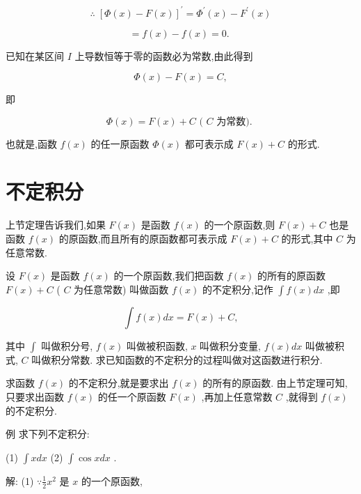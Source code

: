 \documentclass[lang=cn,newtx,10pt,scheme=chinese]{elegantbook}
\begin{document}
\[
\therefore \;{\left\lbrack \Phi \left( x\right) - F\left( x\right) \right\rbrack }^{\prime } = {\Phi }^{\prime }\left( x\right) - {F}^{\prime }\left( x\right)
\]

\[
= f\left( x\right) - f\left( x\right) = 0\text{. }
\]

已知在某区间 \(I\) 上导数恒等于零的函数必为常数,由此得到

\[
\Phi \left( x\right) - F\left( x\right) = C,
\]

即

\[
\Phi \left( x\right) = F\left( x\right) + C\text{ ( }C\text{ 为常数). }
\]

也就是,函数 \(f\left( x\right)\) 的任一原函数 \(\Phi \left( x\right)\) 都可表示成 \(F\left( x\right) + C\) 的形式.

\section{不定积分}

上节定理告诉我们,如果 \(F\left( x\right)\) 是函数 \(f\left( x\right)\) 的一个原函数,则 \(F\left( x\right) + C\) 也是函数 \(f\left( x\right)\) 的原函数,而且所有的原函数都可表示成 \(F\left( x\right) + C\) 的形式,其中 \(C\) 为任意常数.

\begin{definition}[定积分]


设 \(F\left( x\right)\) 是函数 \(f\left( x\right)\) 的一个原函数,我们把函数 \(f\left( x\right)\) 的所有的原函数 \(F\left( x\right) + C\) ( \(C\) 为任意常数) 叫做函数 \(f\left( x\right)\) 的不定积分,记作 \(\int f\left( x\right) {dx}\) ,即

\[
\int f\left( x\right) {dx} = F\left( x\right) + C,
\]

其中 \(\int\) 叫做积分号, \(f\left( x\right)\) 叫做被积函数, \(x\) 叫做积分变量, \(f\left( x\right) {dx}\) 叫做被积式, \(C\) 叫做积分常数. 求已知函数的不定积分的过程叫做对这函数进行积分.

\end{definition}

求函数 \(f\left( x\right)\) 的不定积分,就是要求出 \(f\left( x\right)\) 的所有的原函数. 由上节定理可知,只要求出函数 \(f\left( x\right)\) 的任一个原函数 \(F\left( x\right)\) ,再加上任意常数 \(C\) ,就得到 \(f\left( x\right)\) 的不定积分.

例 求下列不定积分:

(1) \(\int {xdx}\) (2) \(\int \cos {xdx}\) .

解: (1) \(\because \frac{1}{2}{x}^{2}\) 是 \(x\) 的一个原函数,
\end{document}
